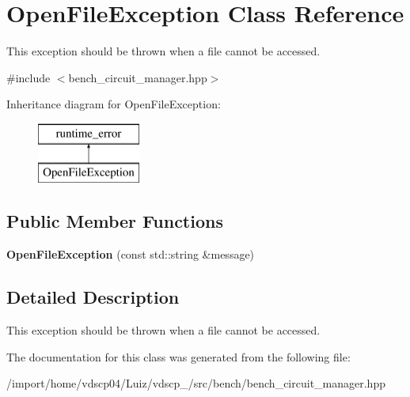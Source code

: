 \section{Open\+File\+Exception Class Reference}
\label{classOpenFileException}


This exception should be thrown when a file cannot be accessed.  




{\ttfamily \#include $<$bench\+\_\+circuit\+\_\+manager.\+hpp$>$}

Inheritance diagram for Open\+File\+Exception\+:\begin{figure}[H]
\begin{center}
\leavevmode
\includegraphics[height=2.000000cm]{classOpenFileException}
\end{center}
\end{figure}
\subsection*{Public Member Functions}
\begin{DoxyCompactItemize}
\item 
{\bfseries Open\+File\+Exception} (const std\+::string \&message)\label{classOpenFileException_a6632ca961e00571c690b071d033651e7}

\end{DoxyCompactItemize}


\subsection{Detailed Description}
This exception should be thrown when a file cannot be accessed. 

The documentation for this class was generated from the following file\+:\begin{DoxyCompactItemize}
\item 
/import/home/vdscp04/\+Luiz/vdscp\+\_/src/bench/bench\+\_\+circuit\+\_\+manager.\+hpp\end{DoxyCompactItemize}
